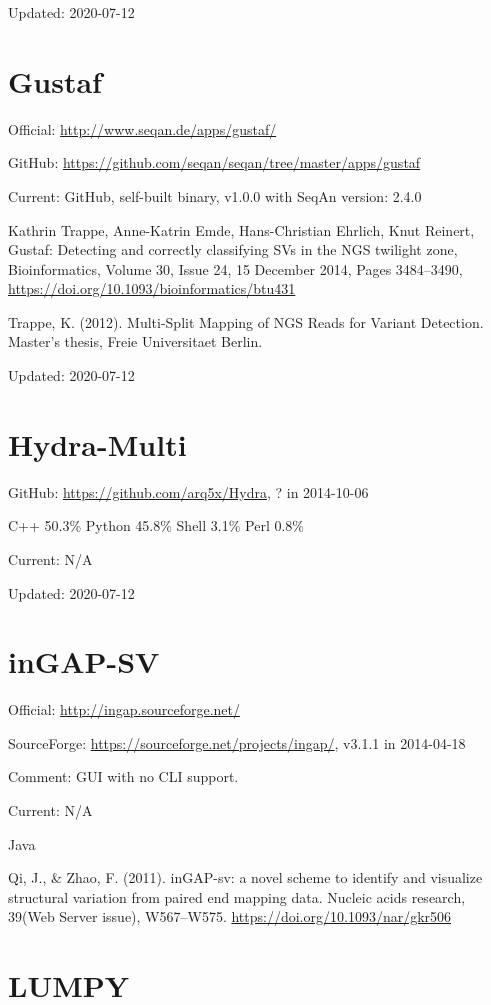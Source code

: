 \documentclass[]{article}
\begin{document}
Updated: 2020-07-12

\section{Gustaf}

Official: \url{http://www.seqan.de/apps/gustaf/}

GitHub: \url{https://github.com/seqan/seqan/tree/master/apps/gustaf}

Current: GitHub, self-built binary, v1.0.0 with SeqAn version: 2.4.0

Kathrin Trappe, Anne-Katrin Emde, Hans-Christian Ehrlich, Knut Reinert, Gustaf: Detecting and correctly classifying SVs in the NGS twilight zone, Bioinformatics, Volume 30, Issue 24, 15 December 2014, Pages 3484–3490, \url{https://doi.org/10.1093/bioinformatics/btu431}

Trappe, K. (2012). Multi-Split Mapping of NGS Reads for Variant Detection. Master’s thesis, Freie Universitaet Berlin.

Updated: 2020-07-12

\section{Hydra-Multi}

GitHub: \url{https://github.com/arq5x/Hydra}, ? in 2014-10-06

C++ 50.3\% Python 45.8\% Shell 3.1\% Perl 0.8\%

Current: N/A

Updated: 2020-07-12

\section{inGAP-SV}

Official: \url{http://ingap.sourceforge.net/}

SourceForge: \url{https://sourceforge.net/projects/ingap/}, v3.1.1 in 2014-04-18

Comment: GUI with no CLI support.

Current: N/A

Java

Qi, J., \& Zhao, F. (2011). inGAP-sv: a novel scheme to identify and visualize structural variation from paired end mapping data. Nucleic acids research, 39(Web Server issue), W567–W575. \url{https://doi.org/10.1093/nar/gkr506}

\section{LUMPY}
\end{document}
